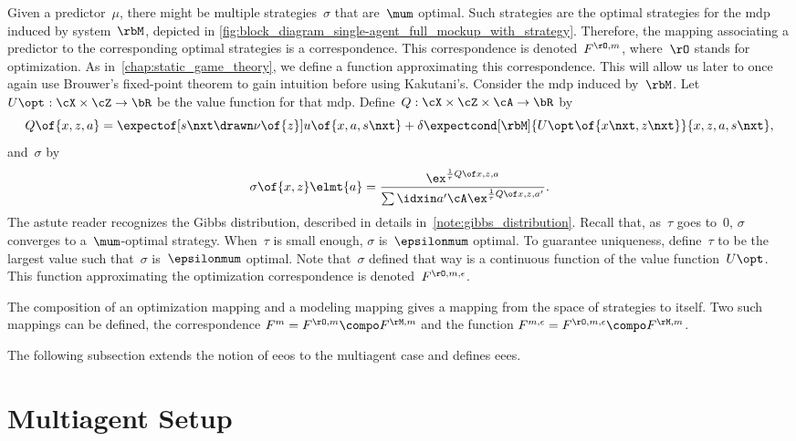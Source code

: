 Given a predictor~\(\mu\), there might be multiple strategies~\(\sigma\) that are~\(\mum\) optimal.
Such strategies are the optimal strategies for the \ac{mdp} induced by system~\(\rbM\), depicted in \cref{fig:block_diagram_single-agent_full_mockup_with_strategy}.
Therefore, the mapping associating a predictor to the corresponding optimal strategies is a correspondence.
This correspondence is denoted~\(\FO\), where~\(\rO\) stands for optimization.
As in~\cref{chap:static_game_theory}, we define a function approximating this correspondence.
This will allow us later to once again use Brouwer's fixed-point theorem to gain intuition before using Kakutani's.
Consider the \ac{mdp} induced by~\(\rbM\).
Let~\(\Uopt : \cX \times \cZ \to \bR\) be the value function for that \ac{mdp}.
Define~\(Q : \cX \times \cZ \times \cA \to \bR\) by
\[
Q \of{x, z, a} = \expectof[s\nxt \drawn \nu \of{z}]{u \of{x, a, s\nxt} + \delta \expectcond[\rbM]{\Uopt \of{x\nxt, z\nxt}}{x, z, a, s\nxt}},
\]
and~\(\sigma\) by
\[
\sigma \of{x, z} \elmt{a} = \gibbsQ.
\]
The astute reader recognizes the Gibbs distribution, described in details in~\cref{note:gibbs_distribution}.
Recall that, as~\(\tau\) goes to~\(0\), \(\sigma\) converges to a~\(\mum\)-optimal strategy.
When~\(\tau\) is small enough, \(\sigma\) is~\(\epsilonmum\) optimal.
To guarantee uniqueness, define~\(\tau\) to be the largest value such that~\(\sigma\) is~\(\epsilonmum\) optimal.
Note that~\(\sigma\) defined that way is a continuous function of the value function~\(\Uopt\).
This function approximating the optimization correspondence is denoted~\(\FOe\).

The composition of an optimization mapping and a modeling mapping gives a mapping from the space of strategies to itself.
Two such mappings can be defined, the correspondence \(\FF = \FO \compo \FM\) and the function \(\FFe = \FOe \compo \FM\).

The following subsection extends the notion of \acp{eeo} to the multiagent case and defines \acp{eee}.

\section{Multiagent Setup}

